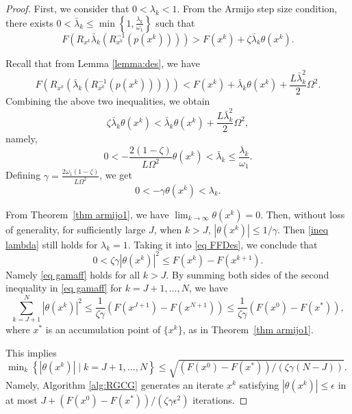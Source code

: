 \documentclass[pdflatex,sn-mathphys-num]{sn-jnl}%
\theoremstyle{definition} %
\theoremstyle{remark} %
\begin{document}
    \begin{proof}
        First, we consider that $0<\lambda_k<1$. From the Armijo step size condition, there exists \(0 < \bar{\lambda}_k \leq \min \left\{1, \frac{\lambda_k}{\omega_1}\right\}\) such that
        $$
        F(R_{x^k} \bar{\lambda}_k(R_{x^k}^{-1}(p (x^k))))>F(x^k)+\zeta \bar{\lambda}_k \theta(x^k) .
        $$
        
        Recall that from Lemma \ref{lemma:des}, we have
        $$
        F(R_{x^k} (\bar{\lambda}_k(R_{x^k}^{-1}(p (x^k))))) < F(x^k)+ \bar{\lambda}_k\theta (x^k) +\frac{L\bar{\lambda}_k^2}{2}\Omega^2.
        $$
        Combining the above two inequalities, we obtain
        $$
        \zeta \bar{\lambda}_k\theta(x^k)< \bar{\lambda}_k\theta (x^k) +\frac{L\bar{\lambda}_k^2}{2}\Omega^2,
        $$
        namely,
        $$
        0 < -\frac{2(1-\zeta)}{L\Omega^2}\theta (x^k) < \bar{\lambda}_k\leq \frac{\lambda_k}{\omega_1}.
        $$
        Defining $\gamma=\frac{2\omega_1(1-\zeta)}{L\Omega^2}$, we get
        \begin{equation}\label{ineq lambda}
            0 < -\gamma\theta (x^k) < \lambda_k.
        \end{equation}

        From Theorem~\ref{thm armijo1}, we have $\lim _{k \rightarrow \infty} \theta(x^k)=0$. Then, without loss of generality, for sufficiently large \(J\), when \(k > J\), \(\left|\theta(x^k)\right| \leq 1/\gamma \). Then \eqref{ineq lambda} still holds for $\lambda_k =1$. 
        Taking it into \eqref{eq FFDes}, we conclude that
        \begin{equation}\label{eq gamaff}
            0 < \zeta \gamma\left|\theta(x^k)\right|^2  \leq F(x^k)-F(x^{k+1}).
        \end{equation}
        Namely \eqref{eq gamaff} holds for all $k > J$.
        By summing both sides of the second inequality in \eqref{eq gamaff} for $k= J+1, \ldots, N$, we have
        $$
        \sum_{k=J+1}^{N}\left|\theta(x^k)\right|^2 \leq \frac{1}{\zeta \gamma}(F(x^{J+1})-F(x^{N+1}))\leq \frac{1}{\zeta \gamma}(F(x^0)-F(x^{*})),
        $$
        where $x^*$ is an accumulation point of $\{x^k\}$, as in Theorem~\ref{thm armijo1}.
        
        This implies $\min_k \left\{\left|\theta(x^k)\right| \mid k= J+1, \ldots, N\right\} \leq \sqrt{(F(x^0)-F(x^{*})) /(\zeta \gamma (N-J))}$.
        Namely, Algorithm \ref{alg:RGCG} generates an iterate $x^k$ satisfying $\left|\theta(x^k)\right| \leq \epsilon$ in at most $J + (F(x^0)-F\left(x^*\right)) /(\zeta \gamma \epsilon^2)$ iterations.
    \end{proof}
\end{document}
